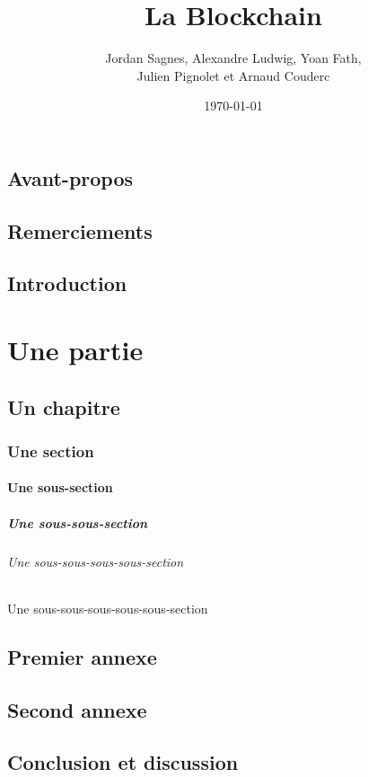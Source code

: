 \documentclass[a4paper]{book}
\title{La Blockchain}
\author{ Jordan Sagnes, Alexandre Ludwig, Yoan Fath, \\ Julien Pignolet et Arnaud Couderc}
\date{\today}
\begin{document}
 
\maketitle
 
    \frontmatter
 
    \chapter{Avant-propos}
    \chapter{Remerciements}
    \chapter{Introduction}
 
    \mainmatter
 
    \part{Une partie}
    \chapter{Un chapitre}
    \section{Une section}
    \subsection{Une sous-section}
    \subsubsection{Une sous-sous-section}
    \paragraph{Une sous-sous-sous-sous-section}
    \subparagraph{Une sous-sous-sous-sous-sous-section}
 
    \appendix
 
    \chapter{Premier annexe}
    \chapter{Second annexe}
 
    
    \backmatter
 
    \chapter{Conclusion et discussion}
 
    
    \tableofcontents    
    \listoffigures        %
    \listoftables        %
 
\end{document}
